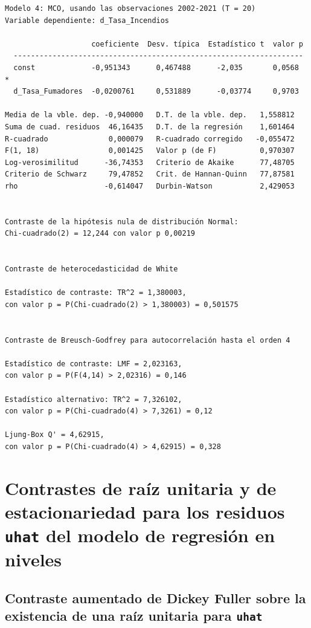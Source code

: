 \documentclass[10pt]{article}
\begin{document}
{\footnotesize
\begin{verbatim}
Modelo 4: MCO, usando las observaciones 2002-2021 (T = 20)
Variable dependiente: d_Tasa_Incendios

                    coeficiente  Desv. típica  Estadístico t  valor p
  -------------------------------------------------------------------
  const             -0,951343      0,467488      -2,035       0,0568  *
  d_Tasa_Fumadores  -0,0200761     0,531889      -0,03774     0,9703 

Media de la vble. dep. -0,940000   D.T. de la vble. dep.   1,558812
Suma de cuad. residuos  46,16435   D.T. de la regresión    1,601464
R-cuadrado              0,000079   R-cuadrado corregido   -0,055472
F(1, 18)                0,001425   Valor p (de F)          0,970307
Log-verosimilitud      -36,74353   Criterio de Akaike      77,48705
Criterio de Schwarz     79,47852   Crit. de Hannan-Quinn   77,87581
rho                    -0,614047   Durbin-Watson           2,429053


Contraste de la hipótesis nula de distribución Normal:
Chi-cuadrado(2) = 12,244 con valor p 0,00219


Contraste de heterocedasticidad de White

Estadístico de contraste: TR^2 = 1,380003,
con valor p = P(Chi-cuadrado(2) > 1,380003) = 0,501575


Contraste de Breusch-Godfrey para autocorrelación hasta el orden 4

Estadístico de contraste: LMF = 2,023163,
con valor p = P(F(4,14) > 2,02316) = 0,146

Estadístico alternativo: TR^2 = 7,326102,
con valor p = P(Chi-cuadrado(4) > 7,3261) = 0,12

Ljung-Box Q' = 4,62915,
con valor p = P(Chi-cuadrado(4) > 4,62915) = 0,328
\end{verbatim}
}

\newpage
\section*{Contrastes de raíz unitaria y de estacionariedad para los residuos \texttt{uhat} del modelo de regresión en niveles}
\label{sec:org2512beb}

\subsection*{Contraste aumentado de Dickey Fuller sobre la existencia de una raíz unitaria para \texttt{uhat}}
\label{sec:orgada8694}
\end{document}

